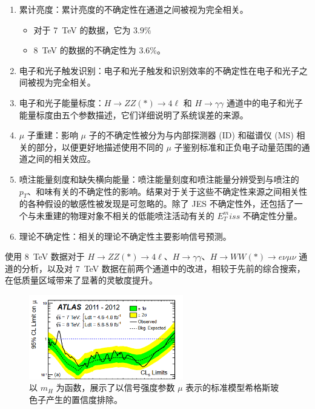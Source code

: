 \documentclass[oneside,a4paper,openany,11pt]{ctexbook}
\begin{document}
\begin{enumerate}
    \item 累计亮度：累计亮度的不确定性在通道之间被视为完全相关。
        \begin{itemize}
            \item 对于 \qty{7}{TeV} 的数据，它为 $3.9\%$
            \item \qty{8}{TeV} 的数据的不确定性为 $3.6\%$。
        \end{itemize}
    \item 电子和光子触发识别：电子和光子触发和识别效率的不确定性在电子和光子之间被视为完全相关。
    \item 电子和光子能量标度：$H \to ZZ(*) \to 4\ell$ 和 $H\to\gamma\gamma$ 通道中的电子和光子能量标度由五个参数描述，它们详细说明了系统误差的来源。
    \item $\mu$ 子重建：影响 $\mu$ 子的不确定性被分为与内部探测器 (ID) 和磁谱仪 (MS) 相关的部分，以便更好地描述使用不同的 $\mu$ 子鉴别标准和正负电子动量范围的通道之间的相关效应。
    \item 喷注能量刻度和缺失横向能量：喷注能量刻度和喷注能量分辨受到与喷注的 $p_T$、和味有关的不确定性的影响。结果对于关于这些不确定性来源之间相关性的各种假设的敏感性被发现是可忽略的。除了 JES 不确定性外，还包括了一个与未重建的物理对象不相关的低能喷注活动有关的 $E_T^miss$ 不确定性分量。
    \item 理论不确定性：相关的理论不确定性主要影响信号预测。
\end{enumerate}

使用 \qty{8}{TeV} 数据对于 $H\to ZZ(*)\to 4\ell$、$H\to\gamma\gamma$、$H\to WW(*)\to e\nu\mu\nu$ 通道的分析，以及对 \qty{7}{TeV} 数据在前两个通道中的改进，相较于先前的综合搜索，在低质量区域带来了显著的灵敏度提升。

\begin{figure}[htbp]
    \centering
    \includegraphics[width=0.6\textwidth]{pic/95CL.png}
    \caption{以 $m_H$ 为函数，展示了以信号强度参数 $\mu$ 表示的标准模型希格斯玻色子产生的置信度排除。}
    \label{fig:mH}
\end{figure}
\end{document}
